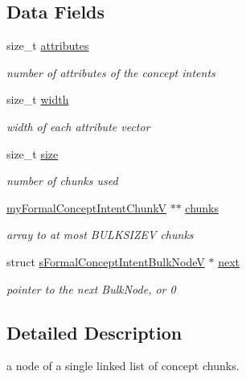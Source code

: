 \subsection*{\-Data \-Fields}
\begin{DoxyCompactItemize}
\item 
size\-\_\-t \hyperlink{structsFormalConceptIntentBulkNodeV_a0bcc56cc39eb49a954c136099d6e46e7}{attributes}
\begin{DoxyCompactList}\small\item\em number of attributes of the concept intents \end{DoxyCompactList}\item 
size\-\_\-t \hyperlink{structsFormalConceptIntentBulkNodeV_ab6c271021365b30649e33b474862f5d8}{width}
\begin{DoxyCompactList}\small\item\em width of each attribute vector \end{DoxyCompactList}\item 
size\-\_\-t \hyperlink{structsFormalConceptIntentBulkNodeV_a516403c9da58b5bedbf72f0a037d5c4f}{size}
\begin{DoxyCompactList}\small\item\em number of chunks used \end{DoxyCompactList}\item 
\hyperlink{fca__structs_8h_abe3c190ec3375121cbfe3afff517b9b9}{my\-Formal\-Concept\-Intent\-Chunk\-V} $\ast$$\ast$ \hyperlink{structsFormalConceptIntentBulkNodeV_a0e2dad46489f048d39181e59eb1c6039}{chunks}
\begin{DoxyCompactList}\small\item\em array to at most \-B\-U\-L\-K\-S\-I\-Z\-E\-V chunks \end{DoxyCompactList}\item 
struct \*
\hyperlink{structsFormalConceptIntentBulkNodeV}{s\-Formal\-Concept\-Intent\-Bulk\-Node\-V} $\ast$ \hyperlink{structsFormalConceptIntentBulkNodeV_ac2cd46a8c3334e2d2fdbc6c203707ed8}{next}
\begin{DoxyCompactList}\small\item\em pointer to the next \-Bulk\-Node, or 0 \end{DoxyCompactList}\end{DoxyCompactItemize}


\subsection{\-Detailed \-Description}
a node of a single linked list of concept chunks. 

